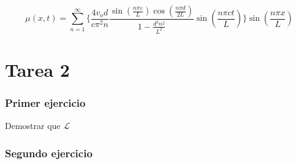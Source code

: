 \documentclass[11pt]{report}
\theoremstyle{plain}
\theoremstyle{definition}
\begin{document}
\begin{equation*}
	\mu(x,t)=\sum^\infty_{n=1}\lbrace \frac{4v_od}{c\pi^2n}\frac{\sin(\frac{n\pi\varepsilon}{L})\cos(\frac{n\pi d}{2L})}{1-\frac{d^2n^2}{L^2}} \sin(\frac{n\pi ct}{L})\rbrace\sin(\frac{n\pi x}{L})
\end{equation*}

\part{Tarea 2}
\section{Primer ejercicio}
Demostrar que $\mathcal{L}$

\section{Segundo ejercicio}
\end{document}
